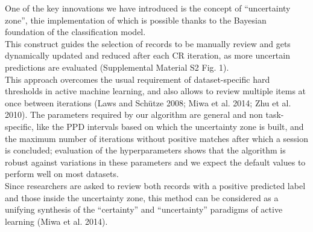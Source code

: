 \documentclass{article}
\begin{document}
One of the key innovations we have introduced is the concept of
``uncertainty zone'', thie implementation of which is possible thanks to
the Bayesian foundation of the classification model.\\
This construct guides the selection of records to be manually review and
gets dynamically updated and reduced after each CR iteration, as more
uncertain predictions are evaluated (Supplemental Material S2 Fig. 1).\\
This approach overcomes the usual requirement of dataset-specific hard
thresholds in active machine learning, and also allows to review
multiple items at once between iterations (Laws and Schütze 2008; Miwa
et al. 2014; Zhu et al. 2010). The parameters required by our algorithm
are general and non task-specific, like the PPD intervals based on which
the uncertainty zone is built, and the maximum number of iterations
without positive matches after which a session is concluded; evaluation
of the hyperparameters shows that the algorithm is robust against
variations in these parameters and we expect the default values to
perform well on most datasets.\\
Since researchers are asked to review both records with a positive
predicted label and those inside the uncertainty zone, this method can
be considered as a unifying synthesis of the ``certainty'' and
``uncertainty'' paradigms of active learning (Miwa et al. 2014).\\
\end{document}
